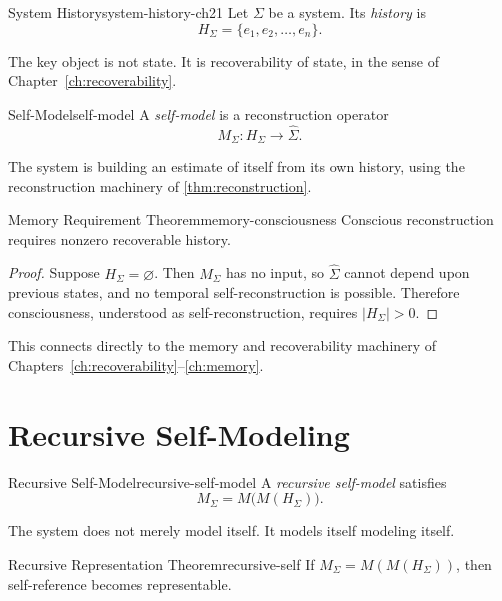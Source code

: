 \documentclass[12pt,twoside,openright]{book}
\begin{document}
\begin{definition}{System History}{system-history-ch21}
  Let $\Sigma$ be a system. Its \emph{history} is
  \[
    H_\Sigma = \{e_1, e_2, \ldots, e_n\}.
  \]
\end{definition}

The key object is not state. It is recoverability of state,
in the sense of Chapter~\ref{ch:recoverability}.

\begin{definition}{Self-Model}{self-model}
  A \emph{self-model} is a reconstruction operator
  \[
    M_\Sigma : H_\Sigma \to \hat{\Sigma}.
  \]
\end{definition}

The system is building an estimate of itself from its own
history, using the reconstruction machinery of
\cref{thm:reconstruction}.

\begin{theorem}{Memory Requirement Theorem}{memory-consciousness}
  Conscious reconstruction requires nonzero recoverable
  history.
\end{theorem}

\begin{proof}
  Suppose $H_\Sigma = \varnothing$. Then $M_\Sigma$ has no
  input, so $\hat{\Sigma}$ cannot depend upon previous
  states, and no temporal self-reconstruction is possible.
  Therefore consciousness, understood as self-reconstruction,
  requires $|H_\Sigma| > 0$.
\end{proof}

This connects directly to the memory and recoverability
machinery of Chapters~\ref{ch:recoverability}--\ref{ch:memory}.

\section{Recursive Self-Modeling}
\label{sec:ch21-recursive}

\begin{definition}{Recursive Self-Model}{recursive-self-model}
  A \emph{recursive self-model} satisfies
  \[
    M_\Sigma = M\bigl(M(H_\Sigma)\bigr).
  \]
\end{definition}

The system does not merely model itself. It models itself
modeling itself.

\begin{theorem}{Recursive Representation Theorem}{recursive-self}
  If $M_\Sigma = M(M(H_\Sigma))$, then self-reference
  becomes representable.
\end{theorem}
\end{document}
